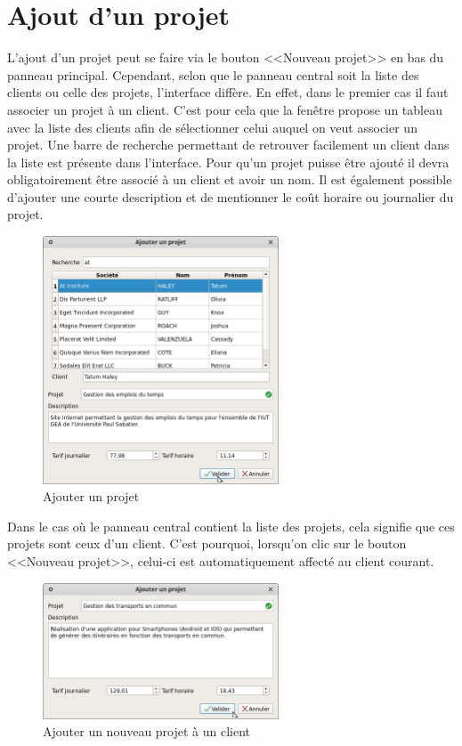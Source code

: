 \section{Ajout d'un projet}
L'ajout d’un projet peut se faire via le bouton <<Nouveau projet>> en bas du panneau principal.
Cependant, selon que le panneau central soit la liste des clients ou celle des projets, l'interface diffère. En effet, dans le premier cas il faut associer un projet à un client. 
C'est pour cela que la fenêtre propose un tableau avec la liste des clients afin de sélectionner celui auquel on veut associer un projet. 
Une barre de recherche permettant de retrouver facilement un client dans la liste est présente dans l'interface. Pour qu'un projet puisse être ajouté il devra obligatoirement être associé à un client et avoir un nom. 
Il est également possible d'ajouter une courte description et de mentionner le coût horaire ou journalier du projet. 
\begin{figure}[H]
	\centering
	\includegraphics[width=7cm]{screens/ajouterProjet.png}
	\caption{Ajouter un projet}
\end{figure}
Dans le cas où le panneau central contient la liste des projets, cela signifie que ces projets sont ceux d'un client. C'est pourquoi, lorsqu'on clic sur le bouton <<Nouveau projet>>, celui-ci est automatiquement affecté au client courant. 
\begin{figure}[H]
	\centering
	\includegraphics[width=7cm]{screens/ajouterProjetClient.png}
	\caption{Ajouter un nouveau projet à un client}
\end{figure}

